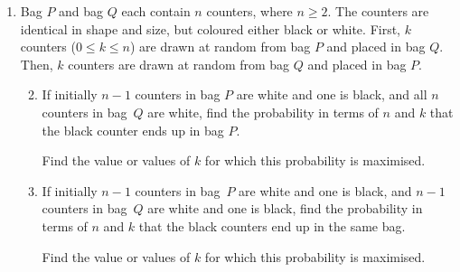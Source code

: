 \documentclass[a4, 11pt]{report}
\newlength{\qspace}
\newcounter{qnumber}
\newenvironment{question}%
 {\vspace{\qspace}
  \begin{enumerate}[\bfseries 1\quad][10]%
    \setcounter{enumi}{\value{qnumber}}%
    \item%
 }
{
  \end{enumerate}
  \filbreak
  \stepcounter{qnumber}
 }
\newenvironment{questionparts}[1][1]%
 {
  \begin{enumerate}[\bfseries (i)]%
    \setcounter{enumii}{#1}
    \addtocounter{enumii}{-1}
    \setlength{\itemsep}{5mm}
    \setlength{\parskip}{8pt}
 }
 {
  \end{enumerate}
 }
\def\le{\leqslant}
\def\ge{\geqslant}
\begin{document}
\begin{question}
Bag $P$ and bag $Q$ each  contain $n$ counters, where $n\ge2$. The
counters are identical
in shape and size, but coloured either black or white. First, $k$ 
counters ($0\le k\le n$) are drawn at random from bag $P$ 
and placed in bag $Q$. Then, $k$ counters are drawn at random from 
bag $Q$ and placed in bag $P$.

\begin{questionparts}
\item If initially
 $n-1$  counters  
in bag $P$ are white and one is black, and 
all $n$ counters in bag~$Q$ are white,  find the probability 
in terms of $n$ and $k$ that the black counter ends up in bag $P$.

Find the value or values of $k$ for which this probability is maximised.

\item If initially
 $n-1$  counters  
in bag~$P$ are white and one is black, and
 $n-1$ counters in bag~$Q$ are white and one is black, 
find the probability 
in terms of $n$ and $k$ that the black counters end up in the same bag.

Find the value or values of $k$ for which this probability is maximised.

\end{questionparts}
\end{question}
\end{document}
